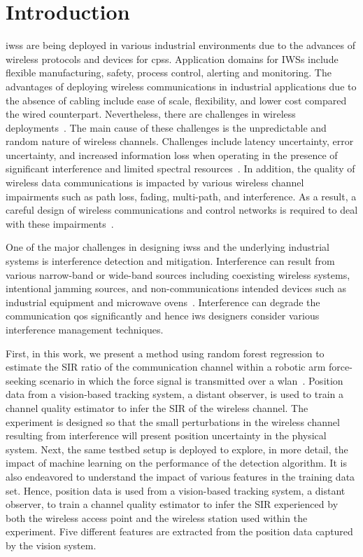 	\section{Introduction} \label{ftml:sec:intro}    
	\Glspl{iws} are being deployed in various industrial environments due to the advances of wireless protocols and devices for \glspl{cps}. Application domains for IWSs include flexible manufacturing, safety, process control, alerting and monitoring\cite{Candell2018.IWSGuide}. The advantages of deploying wireless communications in industrial applications due to the absence of cabling include ease of scale, flexibility, and lower cost compared the wired counterpart. Nevertheless, there are challenges in wireless deployments~\cite{Sisinni2018,Bello2017,Pang2017.WirelessChallenges}. The main cause of these challenges is the unpredictable and random nature of wireless channels. Challenges include latency uncertainty, error uncertainty, and  increased information loss when operating in the presence of significant interference and limited spectral resources~\cite{Candell2017.SAS.IWSWorkshopReport}. In addition, the quality of wireless data communications is impacted by various wireless channel impairments such as path loss, fading, multi-path, and interference. As a result, a careful design of wireless communications and control networks is required to deal with these impairments~\cite{Lu2016.WirelessCPS,Kim2017.WirelessCodesign}.    
    
    One of the major challenges in designing \glspl{iws} and the underlying industrial systems is interference detection and mitigation. Interference can result from various narrow-band or wide-band sources including  coexisting wireless systems, intentional jamming sources, and non-communications intended devices such as industrial equipment and microwave ovens~\cite{Chiwewe2015.Survey.CR.Intf}. Interference can degrade the communication \gls{qos} significantly and hence \gls{iws} designers consider various interference management techniques. 
    
    First, in this work, we present a method using random forest regression to estimate the SIR ratio of the communication channel within a robotic arm force-seeking scenario in which the force signal is transmitted over a \gls{wlan}~\cite{IEEE802.11ac}.  Position data from a vision-based tracking system, a distant observer, is used to train a channel quality estimator to infer the SIR of the wireless channel. The experiment is designed so that the small perturbations in the wireless channel resulting from interference will present position uncertainty in the physical system.  Next, the same testbed setup is deployed to explore, in more detail, the impact of machine learning on the performance of the detection algorithm.  It is also endeavored to understand the impact of various features in the training data set. Hence, position data is used from a vision-based tracking system, a distant observer, to train a channel quality estimator to infer the SIR experienced by both the wireless access point and the wireless station used within the experiment. Five different features are extracted from the position data captured by the vision system. 
    
